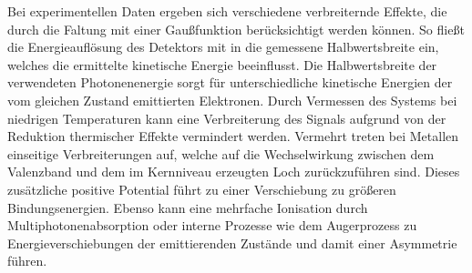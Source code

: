             Bei experimentellen Daten ergeben sich verschiedene verbreiternde Effekte, die durch die Faltung mit einer Gaußfunktion berücksichtigt werden können.
            So fließt die Energieauflösung des Detektors mit in die gemessene Halbwertsbreite ein, welches die ermittelte kinetische Energie beeinflusst.
            Die Halbwertsbreite der verwendeten Photonenenergie sorgt für unterschiedliche kinetische Energien der vom gleichen Zustand emittierten Elektronen.
            Durch Vermessen des Systems bei niedrigen Temperaturen kann eine Verbreiterung des Signals aufgrund von der Reduktion thermischer Effekte vermindert werden.
            Vermehrt treten bei Metallen einseitige Verbreiterungen auf, welche auf die Wechselwirkung zwischen dem Valenzband und dem im Kernniveau erzeugten Loch zurückzuführen sind.
            Dieses zusätzliche positive Potential führt zu einer Verschiebung zu größeren Bindungsenergien.
            Ebenso kann eine mehrfache Ionisation durch Multiphotonenabsorption oder interne Prozesse wie dem Augerprozess zu Energieverschiebungen der emittierenden Zustände und damit einer Asymmetrie führen.

